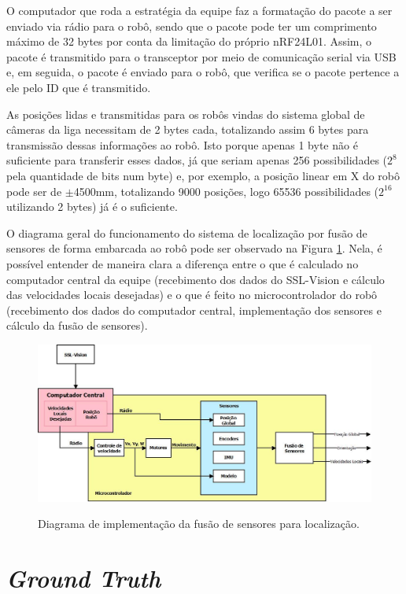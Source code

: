 \documentclass[acronym, symbols, table, deposito]{fei}
\begin{document}
		O computador que roda a estratégia da equipe faz a formatação do pacote a ser enviado via rádio para o robô, sendo que o pacote pode ter um comprimento máximo de 32 bytes por conta da limitação do próprio nRF24L01. Assim, o pacote é transmitido para o transceptor por meio de comunicação serial via USB e, em seguida, o pacote é enviado para o robô, que verifica se o pacote pertence a ele pelo ID que é transmitido.
		
		As posições lidas e transmitidas para os robôs vindas do sistema global de câmeras da liga necessitam de 2 bytes cada, totalizando assim 6 bytes para transmissão dessas informações ao robô. Isto porque apenas 1 byte não é suficiente para transferir esses dados, já que seriam apenas 256 possibilidades ($2^8$ pela quantidade de bits num byte) e, por exemplo, a posição linear em X do robô pode ser de $\pm$4500mm, totalizando 9000 posições, logo 65536 possibilidades ($2^{16}$ utilizando 2 bytes) já é o suficiente.
		
		O diagrama geral do funcionamento do sistema de localização por fusão de sensores de forma embarcada ao robô pode ser observado na Figura \ref{fig:diagrama_implementacao}. Nela, é possível entender de maneira clara a diferença entre o que é calculado no computador central da equipe (recebimento dos dados do SSL-Vision e cálculo das velocidades locais desejadas) e o que é feito no microcontrolador do robô (recebimento dos dados do computador central, implementação dos sensores e cálculo da fusão de sensores).
		
		\begin{figure}[!htb]
			\centering
			\caption{Diagrama de implementação da fusão de sensores para localização.}
			\includegraphics[width=1.00\textwidth]{diagrama_fluxo_implementacao.jpeg}
			\label{fig:diagrama_implementacao}
		\end{figure}
	
	\section{\textit{Ground Truth}}\label{sec:metodologia_ground_truth}
	
\end{document}
